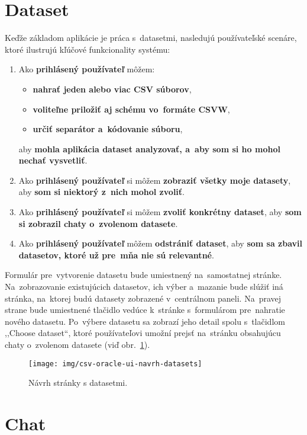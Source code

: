 \section{Dataset}

Keďže základom aplikácie je práca s~datasetmi, nasledujú používateľské scenáre, ktoré ilustrujú kľúčové funkcionality systému:

\begin{enumerate}
\item Ako \textbf{prihlásený používateľ} môžem:
\begin{itemize}
\item \textbf{nahrať jeden alebo viac CSV súborov},
\item \textbf{voliteľne priložiť aj schému vo~formáte CSVW},
\item \textbf{určiť separátor a~kódovanie súboru},
\end{itemize}
aby \textbf{mohla aplikácia dataset analyzovať, a~aby som si ho mohol nechať vysvetliť}.
\item Ako \textbf{prihlásený používateľ} si môžem \textbf{zobraziť všetky moje datasety}, aby \textbf{som si niektorý z~nich mohol zvoliť}.
\item Ako \textbf{prihlásený používateľ} si môžem \textbf{zvoliť konkrétny dataset}, aby \textbf{som si zobrazil chaty o~zvolenom datasete}.
\item Ako \textbf{prihlásený používateľ} môžem \textbf{odstrániť dataset}, aby \textbf{som sa zbavil datasetov, ktoré už pre~mňa nie sú relevantné}.
\end{enumerate}

Formulár pre~vytvorenie datasetu bude umiestnený na~samostatnej stránke. Na~zobrazovanie existujúcich datasetov, ich výber a~mazanie bude slúžiť iná stránka, na~ktorej budú datasety zobrazené v~centrálnom paneli. Na~pravej strane bude umiestnené tlačidlo vedúce k~stránke s~formulárom pre~nahratie nového datasetu. Po~výbere datasetu sa zobrazí jeho detail spolu s~tlačidlom ,,Choose dataset``, ktoré používateľovi umožní prejsť na~stránku obsahujúcu chaty o~zvolenom datasete (viď obr.~\ref{csv-oracle-ui-navrh-datasets}).

\begin{figure}[H]\centering
\texttt{[image: img/csv-oracle-ui-navrh-datasets]}
\caption{Návrh stránky s datasetmi.}
\label{csv-oracle-ui-navrh-datasets}
\end{figure}

\section{Chat}
\label{chat}

